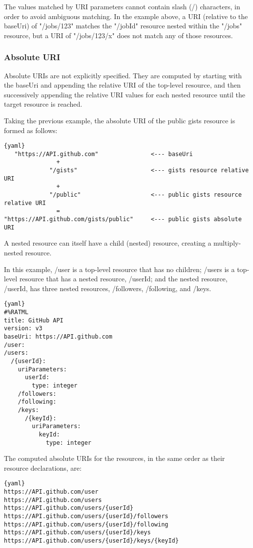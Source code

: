 The values matched by URI parameters cannot contain slash (/) characters, in order to avoid ambiguous matching. In the example above, a URI (relative to the baseUri) of "/jobs/123" matches the "/{jobId}" resource nested within the "/jobs" resource, but a URI of "/jobs/123/x" does not match any of those resources.


\subsubsection{Absolute URI}

Absolute URIs are not explicitly specified. They are computed by starting with the baseUri and appending the relative URI of the top-level resource, and then successively appending the relative URI values for each nested resource until the target resource is reached.

Taking the previous example, the absolute URI of the public gists resource is formed as follows:

\begin{lstlisting}{yaml}
   "https://API.github.com"               <--- baseUri
               +
             "/gists"                     <--- gists resource relative URI
               +
             "/public"                    <--- public gists resource relative URI
               =
"https://API.github.com/gists/public"     <--- public gists absolute URI
\end{lstlisting}

A nested resource can itself have a child (nested) resource, creating a multiply-nested resource.

In this example, /user is a top-level resource that has no children; /users is a top-level resource that has a nested resource, /{userId}; and the nested resource, /{userId}, has three nested resources, /followers, /following, and /keys.

\begin{lstlisting}{yaml}
#%RATML
title: GitHub API
version: v3
baseUri: https://API.github.com
/user:
/users:
  /{userId}:
    uriParameters:
      userId:
        type: integer
    /followers:
    /following:
    /keys:
      /{keyId}:
        uriParameters:
          keyId:
            type: integer
\end{lstlisting}

The computed absolute URIs for the resources, in the same order as their resource declarations, are:

\begin{lstlisting}{yaml}
https://API.github.com/user
https://API.github.com/users
https://API.github.com/users/{userId}
https://API.github.com/users/{userId}/followers
https://API.github.com/users/{userId}/following
https://API.github.com/users/{userId}/keys
https://API.github.com/users/{userId}/keys/{keyId}
\end{lstlisting}

